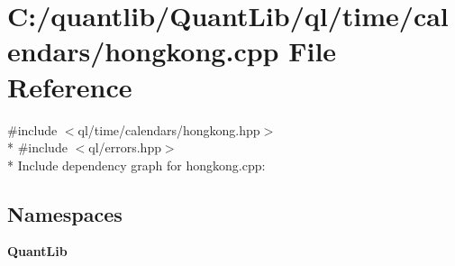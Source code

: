 \section{C\+:/quantlib/\+Quant\+Lib/ql/time/calendars/hongkong.cpp File Reference}
\label{hongkong_8cpp}
{\ttfamily \#include $<$ql/time/calendars/hongkong.\+hpp$>$}\\*
{\ttfamily \#include $<$ql/errors.\+hpp$>$}\\*
Include dependency graph for hongkong.\+cpp\+:
\subsection*{Namespaces}
\begin{DoxyCompactItemize}
\item 
 {\bf Quant\+Lib}
\end{DoxyCompactItemize}
